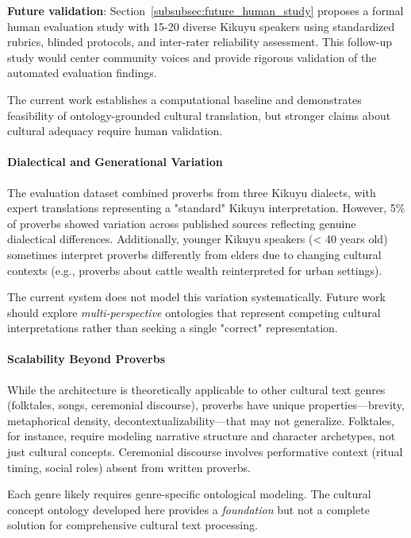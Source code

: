 \textbf{Future validation}: Section~\ref{subsubsec:future_human_study} proposes a formal human evaluation study with 15-20 diverse Kikuyu speakers using standardized rubrics, blinded protocols, and inter-rater reliability assessment. This follow-up study would center community voices and provide rigorous validation of the automated evaluation findings.

The current work establishes a computational baseline and demonstrates feasibility of ontology-grounded cultural translation, but stronger claims about cultural adequacy require human validation.

\paragraph{Dialectical and Generational Variation}

The evaluation dataset combined proverbs from three Kikuyu dialects, with expert translations representing a "standard" Kikuyu interpretation. However, 5\% of proverbs showed variation across published sources reflecting genuine dialectical differences. Additionally, younger Kikuyu speakers (< 40 years old) sometimes interpret proverbs differently from elders due to changing cultural contexts (e.g., proverbs about cattle wealth reinterpreted for urban settings).

The current system does not model this variation systematically. Future work should explore \emph{multi-perspective} ontologies that represent competing cultural interpretations rather than seeking a single "correct" representation.

\paragraph{Scalability Beyond Proverbs}

While the architecture is theoretically applicable to other cultural text genres (folktales, songs, ceremonial discourse), proverbs have unique properties—brevity, metaphorical density, decontextualizability—that may not generalize. Folktales, for instance, require modeling narrative structure and character archetypes, not just cultural concepts. Ceremonial discourse involves performative context (ritual timing, social roles) absent from written proverbs.

Each genre likely requires genre-specific ontological modeling. The cultural concept ontology developed here provides a \emph{foundation} but not a complete solution for comprehensive cultural text processing.

